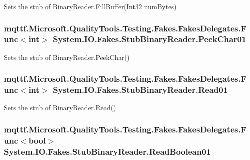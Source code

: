 Sets the stub of Binary\-Reader.\-Fill\-Buffer(\-Int32 num\-Bytes)

\hypertarget{class_system_1_1_i_o_1_1_fakes_1_1_stub_binary_reader_a50c102554d88b73672200941a51a26a0}{
\subsubsection[{Peek\-Char01}]{\setlength{\rightskip}{0pt plus 5cm}mqttf.\-Microsoft.\-Quality\-Tools.\-Testing.\-Fakes.\-Fakes\-Delegates.\-Func$<$int$>$ System.\-I\-O.\-Fakes.\-Stub\-Binary\-Reader.\-Peek\-Char01}}\label{class_system_1_1_i_o_1_1_fakes_1_1_stub_binary_reader_a50c102554d88b73672200941a51a26a0}


Sets the stub of Binary\-Reader.\-Peek\-Char()

\hypertarget{class_system_1_1_i_o_1_1_fakes_1_1_stub_binary_reader_a81199b01e01509cdb4ed9f45d5375153}{
\subsubsection[{Read01}]{\setlength{\rightskip}{0pt plus 5cm}mqttf.\-Microsoft.\-Quality\-Tools.\-Testing.\-Fakes.\-Fakes\-Delegates.\-Func$<$int$>$ System.\-I\-O.\-Fakes.\-Stub\-Binary\-Reader.\-Read01}}\label{class_system_1_1_i_o_1_1_fakes_1_1_stub_binary_reader_a81199b01e01509cdb4ed9f45d5375153}


Sets the stub of Binary\-Reader.\-Read()

\hypertarget{class_system_1_1_i_o_1_1_fakes_1_1_stub_binary_reader_ac9a971de8f7e9e473730d879e316a72c}{
\subsubsection[{Read\-Boolean01}]{\setlength{\rightskip}{0pt plus 5cm}mqttf.\-Microsoft.\-Quality\-Tools.\-Testing.\-Fakes.\-Fakes\-Delegates.\-Func$<$bool$>$ System.\-I\-O.\-Fakes.\-Stub\-Binary\-Reader.\-Read\-Boolean01}}\label{class_system_1_1_i_o_1_1_fakes_1_1_stub_binary_reader_ac9a971de8f7e9e473730d879e316a72c}


